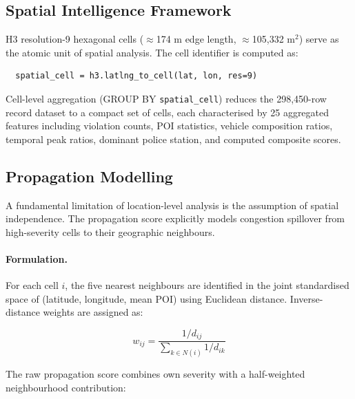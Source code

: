 \documentclass[12pt,a4paper]{article}
\begin{document}
\subsection{Spatial Intelligence Framework}

H3 resolution-9 hexagonal cells ($\approx$174 m edge length, $\approx$105,332 m$^2$) serve
as the atomic unit of spatial analysis. The cell identifier is computed as:

\begin{verbatim}
  spatial_cell = h3.latlng_to_cell(lat, lon, res=9)
\end{verbatim}

Cell-level aggregation (GROUP BY \texttt{spatial\_cell}) reduces the 298,450-row record
dataset to a compact set of cells, each characterised by 25 aggregated features including
violation counts, POI statistics, vehicle composition ratios, temporal peak ratios, dominant
police station, and computed composite scores.


\subsection{Propagation Modelling}

A fundamental limitation of location-level analysis is the assumption of spatial
independence. The propagation score explicitly models congestion spillover from high-severity
cells to their geographic neighbours.

\paragraph{Formulation.}
For each cell $i$, the five nearest neighbours are identified in the joint standardised space
of (latitude, longitude, mean POI) using Euclidean distance. Inverse-distance weights are
assigned as:

\begin{equation}
w_{ij} = \frac{1/d_{ij}}{\displaystyle\sum_{k \in N(i)} 1/d_{ik}}
\label{eq:idw}
\end{equation}

The raw propagation score combines own severity with a half-weighted neighbourhood
contribution:
\end{document}
